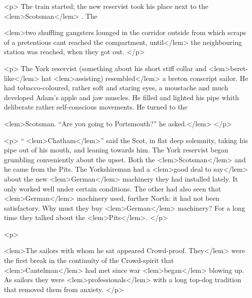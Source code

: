 {{				<p>
					The train started; the new reservist took his place next to the 
<lem>Scotsman</lem>
						{}. 
					The 
					
<lem>two shuffling gangsters lounged in the corridor outside from which scraps of a pretentious cant reached the compartment, until</lem>
						{} 
					the neighbouring station was reached, when 
					they got out. 
 				</p>

				<p>
					The York reservist (something about his short stiff collar and 
<lem>beret-like</lem>
						{} 
					hat 
<lem>assisting) resembled</lem>
						{} 
					a breton conscript sailor. He had tobacco-coloured, rather soft and staring 
					eyes, a moustache and much developed Adam's apple and jaw muscles. He filled and 
					lighted his pipe whith deliberate rather self-conscious movements. He turned to the 
					
<lem>Scotsman. “Are you going to Portsmouth?” he asked.</lem>
						{} 
 				</p>

				<p>
					“
<lem>Chatham</lem>{}” 
					said the Scot, in flat deep solemnity, taking his pipe out of his mouth, and 
					leaning towards him. The York reservist began grumbling conveniently about the 
					upset. Both the 
<lem>Scotsman</lem>
						{} 
					and he came from the Pits. The Yorkshireman had a 
<lem>good deal to say</lem>
						{} 
					about the new 
<lem>German</lem>{} machinery they had installed lately. It only worked well under 
					certain conditions. The other had also seen that 
<lem>German</lem>
						{} 
					machinery used, further North: 
					it had not been satisfactory. Why must they buy 
<lem>German</lem>{} machinery? For a long time they 
					talked about the 
<lem>Pits</lem>{}. 
				</p>

				<p>

<lem>The sailors with whom he sat appeared Crowd-proof. They</lem>
						{} 
					were the first break in the continuity of the Crowd-spirit 
					that 
<lem>Cantelman</lem>
						{} 
					had met since war 
<lem>began</lem>
						{} 
					blowing up. As sailors they were 
<lem>professionals</lem>
						{} 
					with a long top-dog tradition that removed them from anxiety. 
 				</p>

}}
